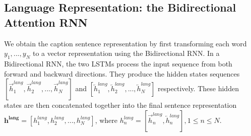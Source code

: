 \documentclass{article} %
\newcommand{\hlang}{h^{lang}}
\newcommand{\hlangall}{\boldsymbol{h^{lang}}}
\begin{document}
\vspace{-0.1in}
\subsection{Language Representation: the Bidirectional Attention RNN}
\label{sec:lang}
We obtain the caption sentence representation by first transforming each word $y_{1},...,y_{N}$ to a vector representation using the Bidirectional RNN. In a Bidirectional RNN, the two LSTMs process the input sequence from both forward and backward directions. They produce the hidden states sequences $[\overrightarrow{h}^{lang}_{1}, \overrightarrow{h}^{lang}_{2}, ..., \overrightarrow{h}^{lang}_{N}]$ and $[\overleftarrow{h}^{lang}_{1}, \overleftarrow{h}^{lang}_{2}, ..., \overleftarrow{h}^{lang}_{N}]$ respectively. These hidden states are then concatenated together into the final sentence representation $\hlangall = [\hlang_{1}, \hlang_{2}, ..., \hlang_{N}]$, where $\hlang_{n} = [\overrightarrow{h}^{lang}_{n}, \overleftarrow{h}^{lang}_{n}], 1\leq n\leq N$.

\vspace{-0.1in}
\end{document}

